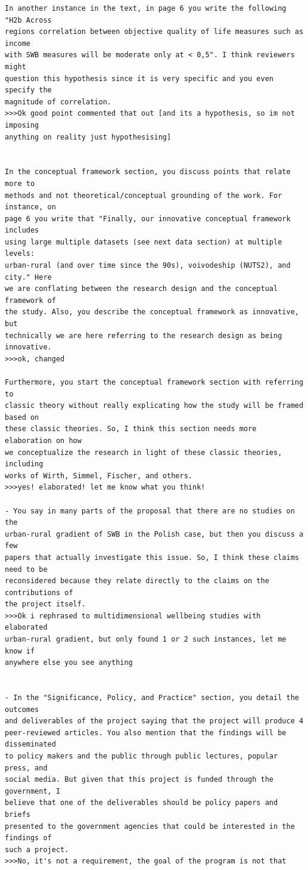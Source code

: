 \documentclass[10pt, letterpaper]{article}
\begin{document}
\begin{spacing}{1.4}
\begin{scriptsize}
\begin{spacing}{1}
\begin{verbatim}
In another instance in the text, in page 6 you write the following "H2b Across
regions correlation between objective quality of life measures such as income
with SWB measures will be moderate only at < 0,5". I think reviewers might
question this hypothesis since it is very specific and you even specify the
magnitude of correlation.
>>>Ok good point commented that out [and its a hypothesis, so im not imposing
anything on reality just hypothesising]


In the conceptual framework section, you discuss points that relate more to
methods and not theoretical/conceptual grounding of the work. For instance, on
page 6 you write that "Finally, our innovative conceptual framework includes
using large multiple datasets (see next data section) at multiple levels:
urban-rural (and over time since the 90s), voivodeship (NUTS2), and city." Here
we are conflating between the research design and the conceptual framework of
the study. Also, you describe the conceptual framework as innovative, but
technically we are here referring to the research design as being innovative.
>>>ok, changed
 
Furthermore, you start the conceptual framework section with referring to
classic theory without really explicating how the study will be framed based on
these classic theories. So, I think this section needs more elaboration on how
we conceptualize the research in light of these classic theories, including
works of Wirth, Simmel, Fischer, and others.
>>>yes! elaborated! let me know what you think!

- You say in many parts of the proposal that there are no studies on the
urban-rural gradient of SWB in the Polish case, but then you discuss a few
papers that actually investigate this issue. So, I think these claims need to be
reconsidered because they relate directly to the claims on the contributions of
the project itself.
>>>Ok i rephrased to multidimensional wellbeing studies with elaborated
urban-rural gradient, but only found 1 or 2 such instances, let me know if
anywhere else you see anything


- In the "Significance, Policy, and Practice" section, you detail the outcomes
and deliverables of the project saying that the project will produce 4
peer-reviewed articles. You also mention that the findings will be disseminated
to policy makers and the public through public lectures, popular press, and
social media. But given that this project is funded through the government, I
believe that one of the deliverables should be policy papers and briefs
presented to the government agencies that could be interested in the findings of
such a project. 
>>>No, it's not a requirement, the goal of the program is not that


\end{verbatim}
\end{spacing}
\end{scriptsize}
\end{spacing}
\end{document}
